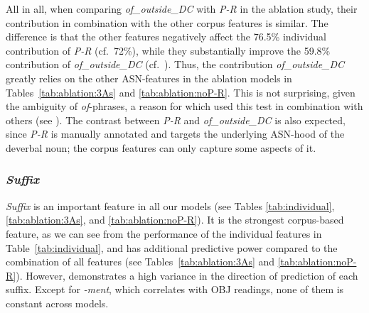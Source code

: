 \documentclass[output=paper]{langsci/langscibook}
\begin{document}
All in all, when comparing \textit{of\_outside\_DC} with \textit{P-R} in the ablation study, their contribution in combination with the other corpus features is similar.  {The difference is that the other features negatively affect the  76.5\% individual contribution  of \textit{P-R} (cf.\ 72\%), while they substantially improve the 59.8\% contribution of \textit{of\_outside\_DC} (cf.\ ).} Thus, the  contribution \textit{of\_outside\_DC}  greatly relies on the other ASN-features in the ablation models in Tables~\ref{tab:ablation:3As} and \ref{tab:ablation:noP-R}. This is not surprising, given the ambiguity of \textit{of}-phrases, a reason for which \cite{grimshaw:90} used this test in combination with others (see ). The contrast between \textit{P-R} and \textit{of\_outside\_DC} is also expected, since \textit{P-R} is manually annotated and targets the underlying ASN-hood of the deverbal noun; the corpus features can only capture some aspects of it.






\subsubsection{\textit{Suffix}}\label{sec:gia:discussion-int-suffix}
\textit{Suffix} is an important feature in all our models (see Tables \ref{tab:individual}, \ref{tab:ablation:3As}, and \ref{tab:ablation:noP-R}).  {It is the strongest corpus-based feature, as we can see from the performance of the individual features in Table~\ref{tab:individual}, and has additional predictive power compared to the combination of all features}  {(see Tables~\ref{tab:ablation:3As} and \ref{tab:ablation:noP-R}).} However,  demonstrates a high variance in the direction of prediction of each suffix.  {Except for \textit{-ment}, which correlates with OBJ readings,} none of them is constant across models. 
\end{document}
